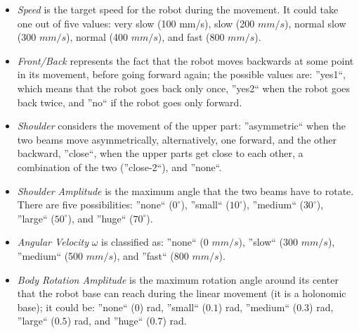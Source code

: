 \begin{itemize}

	\item \textit{Speed} is the target speed for the robot during the movement. It could take one out of five values: very slow (100 mm/s), slow (200 $mm/s$), normal slow (300 $mm/s$), normal (400 $mm/s$), and fast (800 $mm/s$).

	\item \textit{Front/Back} represents the fact that the robot moves backwards at some point in its movement, before going forward again; the possible values are: ''yes1``, which means that the robot goes back only once, ''yes2`` when the robot goes back twice, and ''no`` if the robot goes only forward.

	\item \textit{Shoulder} considers the movement of the upper part: ''asymmetric`` when the two beams move asymmetrically, alternatively, one forward, and the other backward, ''close``, when the upper parts get close to each other, a combination of the two (''close-2``), and ''none``. 

	\item \textit{Shoulder Amplitude} is the maximum angle that the two beams have to rotate. There are five possibilities: ''none`` ($0^\circ$), ''small`` ($10^\circ$), ''medium`` ($30^\circ$), ''large`` ($50^\circ$), and ''huge`` ($70^\circ$).

	\item \textit{Angular Velocity} $\omega$ is classified as: ''none`` (0 $mm/s$), ''slow`` (300 $mm/s$), ''medium`` (500 $mm/s$), and ''fast`` (800 $mm/s$).

	\item \textit{Body Rotation Amplitude} is the maximum  rotation angle around its center that the robot base can reach during the linear movement (it is a holonomic base); it could be: ''none`` ($0$) rad, ''small`` ($0.1$) rad, ''medium`` ($0.3$) rad, ''large`` ($0.5$) rad, and ''huge`` ($0.7$) rad.
\end{itemize}


